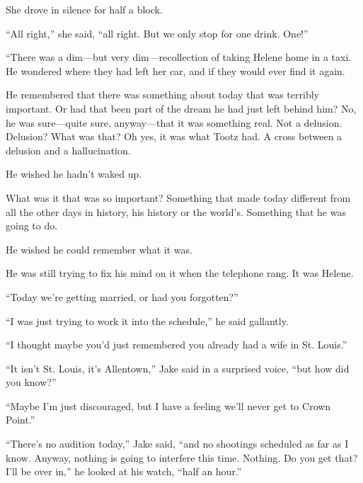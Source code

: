 \documentclass{novel}
\begin{document}
She drove in silence for half a block.

“All right,” she said, “all right. But we only stop for one drink. One!”

\begin{ChapterStart}
\vspace{3\nbs}
\end{ChapterStart}

“There was a dim—but very dim—recollection of taking Helene home in a taxi. He wondered where they had left her car, and if they would ever find it again.

He remembered that there was something about today that was terribly important. Or had that been part of the dream he had just left behind him? No, he was sure—quite sure, anyway—that it was something real. Not a delusion. Delusion? What was that? Oh yes, it was what Tootz had. A cross between a delusion and a hallucination.

He wished he hadn’t waked up.

What was it that was so important? Something that made today different from all the other days in history, his history or the world’s. Something that he was going to do.

He wished he could remember what it was.

He was still trying to fix his mind on it when the telephone rang. It was Helene.

“Today we’re getting married, or had you forgotten?”

“I was just trying to work it into the schedule,” he said gallantly.

“I thought maybe you’d just remembered you already had a wife in St. Louis.”

“It isn’t St. Louis, it’s Allentown,” Jake said in a surprised voice, “but how did you know?”

“Maybe I’m just discouraged, but I have a feeling we’ll never get to Crown Point.”

“There’s no audition today,” Jake said, “and no shootings scheduled as far as I know. Anyway, nothing is going to interfere this time. Nothing. Do you get that? I’ll be over in,” he looked at his watch, “half an hour.”
\end{document}

